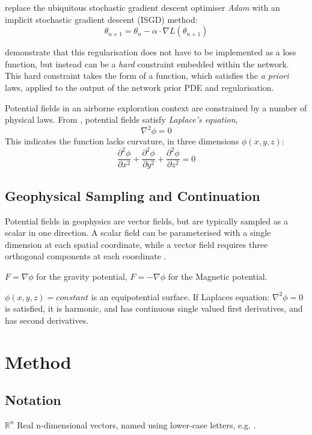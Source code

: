 \documentclass{article}
\begin{document}
\parencite{liImplicitStochasticGradient2023} replace the ubiquitous stochastic gradient descent optimiser \emph{Adam} with an implicit stochastic gradient descent (ISGD) method:
$$\theta_{n+1} = \theta_{n} - \alpha \cdot \nabla L (\theta_{n+1})$$


\parencite{sethiHardEnforcementPhysicsinformed2023} demonstrate that this regularisation does not have to be implemented as a loss function, but instead can be a \emph{hard} constraint embedded within the network.
This hard constraint takes the form of a function, which satisfies the \emph{a priori} laws, applied to the output of the network prior PDE and regularisation.

Potential fields in an airborne exploration context are constrained by a number of physical laws.
From \parencite{blakelyPotentialTheoryGravity1996}, potential fields satisfy \emph{Laplace's equation},
$$\nabla^2 \phi = 0$$
This indicates the function lacks curvature, in three dimensions $\phi(x,y,z)$:
$$\frac{\partial^2\phi}{\partial x^2} + \frac{\partial^2\phi}{\partial y^2} + \frac{\partial^2\phi}{\partial z^2} = 0$$

\subsection{Geophysical Sampling and Continuation}
\label{sec:geo_sampling}
Potential fields in geophysics are vector fields, but are typically sampled as a scalar in one direction.
A scalar field can be parameterised with a single dimension at each spatial coordinate, while a vector field requires three orthogonal components at each coordinate \parencite{blakelyPotentialTheoryGravity1996}.

$F = \nabla \phi$ for the gravity potential, $F = - \nabla \phi$ for the Magnetic potential.

$\phi(x,y,z) = constant$ is an equipotential surface. If Laplaces equation: $\nabla^2 \phi = 0$ is satisfied, it is harmonic, and has continuous single valued first derivatives, and has second derivatives.


\section{Method}
\subsection{Notation}
$\mathbb{R}^n$ Real n-dimensional vectors, named using lower-case letters, e.g. .
\end{document}
